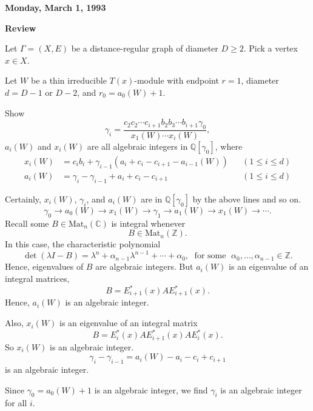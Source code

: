 \documentclass[
]{book}
\theoremstyle{definition}
\theoremstyle{definition}
\theoremstyle{definition}
\theoremstyle{definition}
\theoremstyle{remark}
\begin{document}
\textbf{Monday, March 1, 1993}

\textbf{Review}

Let \(\Gamma = (X, E)\) be a distance-regular graph of diameter \(D\geq 2\). Pick a vertex \(x\in X\).

Let \(W\) be a thin irreducible \(T(x)\)-module with endpoint \(r = 1\), diameter \(d = D-1\) or \(D-2\), and \(r_0 = a_0(W) + 1\).

Show
\[\gamma_i = \frac{c_2c_2\cdots c_{i+1}b_2b_3\cdots b_{i+1}\gamma_0}{x_1(W)\cdots x_i(W)},\]
\(a_i(W)\) and \(x_i(W)\) are all algebraic integers in \(\mathbb{Q}[\gamma_0]\), where
\begin{align}
x_i(W) & = c_ib_i + \gamma_{i-1}(a_i + c_i - c_{i+1}-a_{i-1}(W)) && (1\leq i\leq d)\\
a_i(W) & = \gamma_i - \gamma_{i-1} + a_i + c_i - c_{i+1} && (1\leq i\leq d)
\end{align}

Certainly, \(x_i(W)\), \(\gamma_i\), and \(a_i(W)\) are in \(\mathbb{Q}[\gamma_0]\) by the above lines and so on.
\[\gamma_0 \to a_0(W) \to x_1(W) \to \gamma_1 \to a_1(W)\to x_1(W) \to \cdots .\]
Recall some \(B\in \mathrm{Mat}_n(\mathbb{C})\) is integral whenever
\[B\in \mathrm{Mat}_n(\mathbb{Z}).\]
In this case, the characteristic polynomial
\[\det(\lambda I - B) = \lambda^n + \alpha_{n-1}\lambda^{n-1} + \cdots + \alpha_0, \; \text{ for some }\; \alpha_0, \ldots, \alpha_{n-1}\in \mathbb{Z}.\]
Hence, eigenvalues of \(B\) are algebraic integers.
But \(a_i(W)\) is an eigenvalue of an integral matrices,
\[B = E^*_{i+1}(x)AE^*_{i+1}(x).\]
Hence, \(a_i(W)\) is an algebraic integer.

Also, \(x_i(W)\) is an eigenvalue of an integral matrix
\[B = E^*_i(x)AE^*_{i+1}(x)AE^*_i(x).\]
So \(x_i(W)\) is an algebraic integer.
\[\gamma_i - \gamma_{i-1} = a_i(W) - a_i - c_i + c_{i+1}\]
is an algebraic integer.

Since \(\gamma_0 = a_0(W) + 1\) is an algebraic integer, we find \(\gamma_i\) is an algebraic integer for all \(i\).
\end{document}
